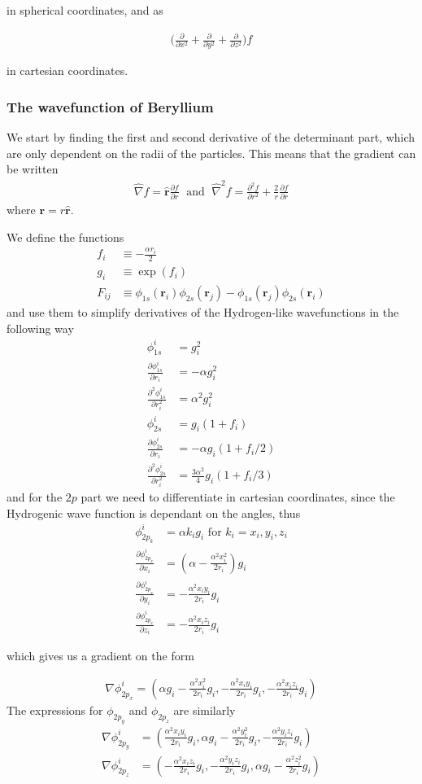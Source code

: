\documentclass[twocolumns, a4paper,11pt,fleqn]{extarticle}
\newcommand{\eq}[1]{{\small\begin{align*}#1\end{align*}}}
\renewcommand\vec[1]{\boldsymbol{\mathbf{#1}}}
\newcommand{\op}[1]{\hat{#1}}
\newcommand{\unit}[1]{\mathbf{\hat{#1}}}
\begin{document}
in spherical coordinates, and as

{\small
\eq{
	\bigg( 
	\frac{\partial}{\partial x^2} +
	\frac{\partial}{\partial y^2} +
	\frac{\partial}{\partial z^2}
	\bigg) f
}}%

in cartesian coordinates.
\subsubsection{The wavefunction of Beryllium}
We start by finding the first and second derivative of the determinant part,
which are only dependent on the radii of the particles. This means that the gradient can be written 
\eq{
  \op\nabla f = \unit r \frac{\partial f}{\partial r}
  \;\text{ and }\;
  \op\nabla^2 f = \frac{\partial^2 f}{\partial r^2} 
    + \frac{2}{r}\frac{\partial f}{\partial r}
}
where $\vec r = r\unit r$.
  
We define the functions
\eq{
  f_i &\equiv -\frac{\alpha r_i}{2}\\
  g_i &\equiv \exp(f_i)\\
  F_{ij} &\equiv \phi_{1s}(\vec r_i)\phi_{2s}(\vec r_j)
  -\phi_{1s}(\vec r_j)\phi_{2s}(\vec r_i)
}
and use them to simplify derivatives 
of the Hydrogen-like wavefunctions in the following way
\eq{
  \phi_{1s}^i &= g_i^2\\
  \frac{\partial \phi_{1s}^i}{\partial r_i} &= -\alpha g_i^2\\
  \frac{\partial^2 \phi_{1s}^i}{\partial r_i^2} &= \alpha^2 g_i^2\\
  \phi_{2s}^i &= g_i(1+f_i)\\
  \frac{\partial \phi_{2s}^i}{\partial r_i} &= -\alpha g_i(1+f_i/2)\\
  \frac{\partial^2 \phi_{2s}^i}{\partial r_i^2} &= \frac{3\alpha^2}{4} g_i(1+f_i/3)
  }
  and for the $2p$ part we need to differentiate in cartesian coordinates,
  since the Hydrogenic wave function is dependant on the
  angles, thus
  \eq{
  \phi_{2p_k}^i &= \alpha k_i g_i \text{ for } k_i = x_i,y_i,z_i\\
  \frac{\partial\phi_{2p_x}^i}{\partial x_i} 
    &= \left(\alpha - \frac{\alpha^2 x_i^2}{2 r_i} \right)g_i\\
  \frac{\partial\phi_{2p_x}^i}{\partial y_i} 
    &=-\frac{\alpha^2 x_i y_i }{2 r_i} g_i\\ 
  \frac{\partial\phi_{2p_x}^i}{\partial z_i} 
    &=-\frac{\alpha^2 x_i z_i}{2 r_i} g_i
}

which gives us a gradient on the form

\eq{
  \nabla \phi_{2p_x}^i = 
  \left(
  \alpha g_i - \frac{\alpha^2 x_i^2}{2 r_i}g_i,
    -\frac{\alpha^2 x_i y_i }{2 r_i} g_i,
    -\frac{\alpha^2 x_i z_i}{2 r_i} g_i
  \right)
}
The expressions for $\phi_{2p_y}$ and $\phi_{2p_z}$ are similarly
\eq{
  \nabla \phi_{2p_y}^i &= 
  \left(
  \frac{\alpha^2 x_i y_i}{2 r_i}g_i,
    \alpha g_i -\frac{\alpha^2 y_i^2 }{2 r_i} g_i,
    -\frac{\alpha^2 y_i z_i}{2 r_i} g_i
  \right)\\
  \nabla \phi_{2p_z}^i &= 
  \left(
  -\frac{\alpha^2 x_i z_i}{2 r_i}g_i,
    -\frac{\alpha^2 y_i z_i}{2 r_i} g_i,
    \alpha g_i -\frac{\alpha^2 z_i^2}{2 r_i} g_i
  \right)
}
\end{document}
